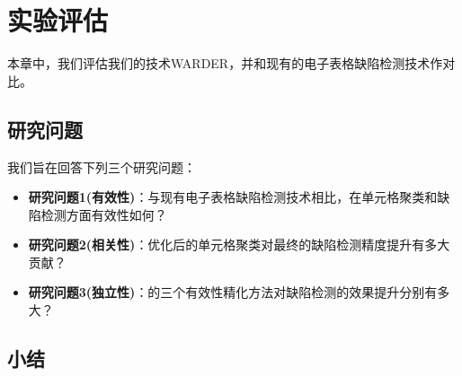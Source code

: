 \chapter{实验评估}

本章中，我们评估我们的技术WARDER，并和现有的电子表格缺陷检测技术作对比。

\section{研究问题}

我们旨在回答下列三个研究问题：

\begin{itemize}
    \item \textbf{研究问题1(有效性)}：与现有电子表格缺陷检测技术相比，\wa 在单元格聚类和缺陷检测方面有效性如何？
    \item \textbf{研究问题2(相关性)}：\wa 优化后的单元格聚类对最终的缺陷检测精度提升有多大贡献？
    \item \textbf{研究问题3(独立性)}：\wa 的三个有效性精化方法对缺陷检测的效果提升分别有多大？
\end{itemize}





\section{小结}
